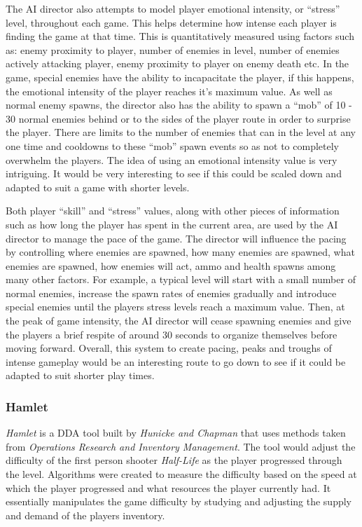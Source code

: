 \documentclass[journal]{IEEEtran}
\begin{document}
The AI director also attempts to model player emotional intensity, or ``stress'' level, throughout each game. This helps determine how intense each player is finding the game at that time. This is quantitatively measured using factors such as: enemy proximity to player, number of enemies in level, number of enemies actively attacking player, enemy proximity to player on enemy death etc. In the game, special enemies have the ability to incapacitate the player, if this happens, the emotional intensity of the player reaches it's maximum value. As well as normal enemy spawns, the director also has the ability to spawn a ``mob'' of 10 - 30 normal enemies behind or to the sides of the player route in order to surprise the player. There are limits to the number of enemies that can in the level at any one time and cooldowns to these ``mob'' spawn events so as not to completely overwhelm the players. The idea of using an emotional intensity value is very intriguing. It would be very interesting to see if this could be scaled down and adapted to suit a game with shorter levels. 

Both player ``skill'' and ``stress'' values, along with other pieces of information such as how long the player has spent in the current area, are used by the AI director to manage the pace of the game. The director will influence the pacing by controlling where enemies are spawned, how many enemies are spawned, what enemies are spawned, how enemies will act, ammo and health spawns among many other factors. For example, a typical level will start with a small number of normal enemies, increase the spawn rates of enemies gradually and introduce special enemies until the players stress levels reach a maximum value. Then, at the peak of game intensity, the AI director will cease spawning enemies and give the players a brief respite of around 30 seconds to organize themselves before moving forward.
Overall, this system to create pacing, peaks and troughs of intense gameplay would be an interesting route to go down to see if it could be adapted to suit shorter play times. 
 
\subsubsection{Hamlet}
\textit{Hamlet} \cite{hunicke2005case} is a DDA tool built by \textit{Hunicke and Chapman} that uses methods taken from \textit{Operations Research and Inventory Management}. The tool would adjust the difficulty of the first person shooter \textit{Half-Life} \cite{game:halflife} as the player progressed through the level. Algorithms were created to measure the difficulty based on the speed at which the player progressed and what resources the player currently had. It essentially manipulates the game difficulty by studying and adjusting the supply and demand of the players inventory.
\end{document}

